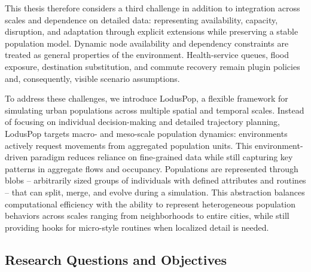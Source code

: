 \documentclass[pdflatex,sn-mathphys-num]{sn-jnl}%
\newcommand\redb[1]{#1}
\theoremstyle{thmstyleone}%
\theoremstyle{thmstyletwo}%
\theoremstyle{thmstylethree}%
\begin{document}
This thesis therefore considers a third challenge in addition to integration across scales and dependence on detailed data: representing availability, capacity, disruption, and adaptation through explicit extensions while preserving a stable population model. Dynamic node availability and dependency constraints are treated as general properties of the environment. Health-service queues, flood exposure, destination substitution, and commute recovery remain plugin policies and, consequently, visible scenario assumptions.


To address these challenges, we introduce LodusPop, a flexible framework for simulating urban populations across multiple spatial and temporal scales. \redb{Instead of focusing on individual decision-making and detailed trajectory planning, LodusPop targets macro- and meso-scale population dynamics: environments actively request movements from aggregated population units.} This environment-driven paradigm reduces reliance on fine-grained data while still capturing key patterns in aggregate flows and occupancy. Populations are represented through blobs -- arbitrarily sized groups of individuals with defined attributes and routines -- that can split, merge, and evolve during a simulation. This abstraction balances computational efficiency with the ability to represent heterogeneous population behaviors across scales ranging from neighborhoods to entire cities, while still providing hooks for micro-style routines when localized detail is needed.

\subsection{Research Questions and Objectives}
\end{document}
